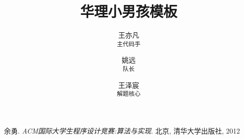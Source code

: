 \documentclass{report}
\begin{document}
\title{华理小男孩模板}
\author{
王亦凡 \\ 
\texttt{主代码手}
\and
姚远 \\ 
\texttt{队长}
\and
王泽宸 \\ 
\texttt{解题核心}
}
\maketitle
\tableofcontents
\newpage








\begin{thebibliography}{9}
余勇. 
\textit{ACM国际大学生程序设计竞赛:算法与实现}. 
北京, 清华大学出版社, 2012
\end{thebibliography}
\end{document}
